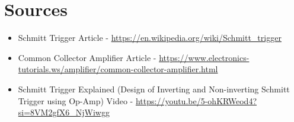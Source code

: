 \documentclass[9pt,a4paper,twoside]{tau-class/tau}
\begin{document}
\section{Sources} %
	\begin{itemize}
	\item Schmitt Trigger Article - \url{https://en.wikipedia.org/wiki/Schmitt_trigger}
	\item Common Collector Amplifier Article - \url{https://www.electronics-tutorials.ws/amplifier/common-collector-amplifier.html}
	\item Schmitt Trigger Explained (Design of Inverting and Non-inverting Schmitt Trigger using Op-Amp) Video - \url{https://youtu.be/5-ohKRWeod4?si=8VM2gfX6_NjWiwgg}
	\end{itemize}

\end{document}
